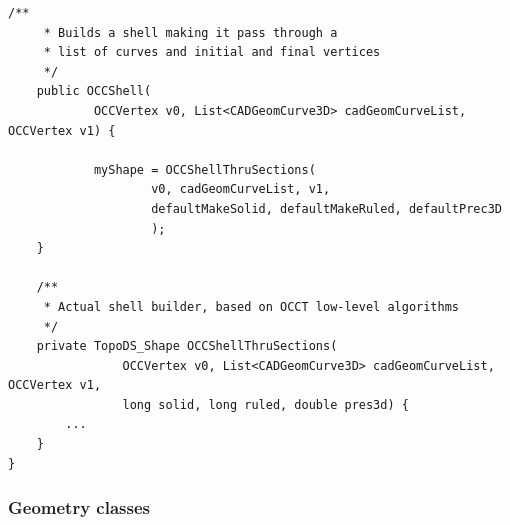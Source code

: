 \begin{lstlisting}[caption={\lstinline!OCCShell! constructors and methods}, captionpos=b, tabsize=2, label={lst:shellConstructors}]
	/**
	 * Builds a shell making it pass through a 
	 * list of curves and initial and final vertices
	 */
	public OCCShell(
			OCCVertex v0, List<CADGeomCurve3D> cadGeomCurveList, OCCVertex v1) {
			
			myShape = OCCShellThruSections(
					v0, cadGeomCurveList, v1, 
					defaultMakeSolid, defaultMakeRuled, defaultPrec3D
					);
	}
	
	/**
	 * Actual shell builder, based on OCCT low-level algorithms
	 */
	private TopoDS_Shape OCCShellThruSections(
				OCCVertex v0, List<CADGeomCurve3D> cadGeomCurveList, OCCVertex v1,
				long solid, long ruled, double pres3d) {		
		...
	}
}
\end{lstlisting}
%

\subsubsection{Geometry classes}

